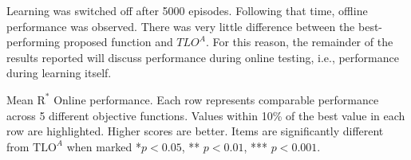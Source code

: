 Learning was switched off after 5000 episodes. Following that time, offline performance was observed. There was very little difference between the best-performing proposed function and $TLO^A$. For this reason, the remainder of the results reported will discuss performance during online testing, i.e., performance during learning itself.%


\begin{table}[t]
\footnotesize
  \caption{Mean $\text{R}^*$ Online performance. Each row represents comparable performance across 5 different objective functions. Values within 10\% of the best value in each row are highlighted. Higher scores are better. Items are significantly different from $\text{TLO}^A$ when marked *$p<0.05$, ** $p <0.01$, *** $p<0.001$.}
  \label{tab:mean_r_star_performance}
\begin{adjustbox}{width=\columnwidth}

\end{adjustbox}
\end{table}

 


